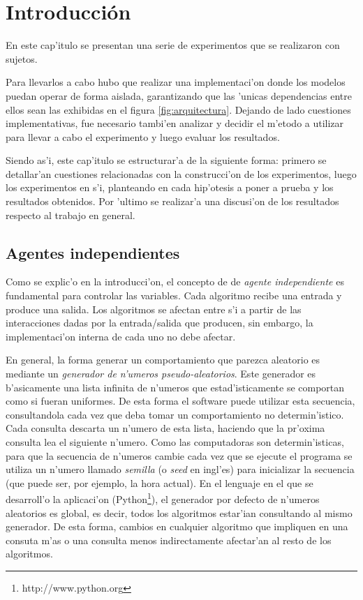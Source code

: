 \section{Introducci\'on}
En este cap'itulo se presentan una serie de experimentos que se realizaron con sujetos. 

Para llevarlos a cabo hubo que 
realizar una implementaci'on donde los modelos puedan operar de forma aislada, garantizando que las 'unicas dependencias 
entre ellos sean las exhibidas en el figura \ref{fig:arquitectura}. Dejando de lado cuestiones implementativas, 
fue necesario tambi'en analizar y decidir el m'etodo a utilizar para llevar a cabo el experimento y luego evaluar los resultados.

Siendo as'i, este cap'itulo se estructurar'a de la siguiente forma: primero se detallar'an cuestiones relacionadas con 
la construcci'on de los experimentos, luego los experimentos en s'i, planteando en cada hip'otesis a poner a prueba y los
resultados obtenidos.
Por 'ultimo se realizar'a una discusi'on de los resultados respecto al trabajo en general.

\subsection{Agentes independientes}
Como se explic'o en la introducci'on, el concepto de de \emph{agente independiente} es fundamental para controlar las variables. 
Cada algoritmo recibe una entrada y produce una salida. Los algoritmos se afectan entre s'i a partir de las 
interacciones dadas por la entrada/salida que producen, sin embargo, la implementaci'on interna de cada uno
no debe afectar. 

En general, la forma generar un comportamiento que parezca aleatorio es mediante un \emph{generador de n'umeros pseudo-aleatorios}. 
Este generador es b'asicamente una lista infinita de n'umeros que estad'isticamente se comportan como si fueran uniformes. 
De esta forma el software puede utilizar esta secuencia, consultandola cada vez que deba tomar un comportamiento no determin'istico. 
Cada consulta descarta un n'umero de esta lista, haciendo que la pr'oxima consulta lea el siguiente n'umero. 
Como las computadoras son determin'isticas, para que la secuencia de n'umeros cambie cada vez que se ejecute el programa se utiliza un n'umero 
llamado \emph{semilla} (o \emph{seed} en ingl'es) para inicializar la secuencia (que puede ser, por ejemplo, la hora actual). 
En el lenguaje en el que se desarroll'o la aplicaci'on (Python\footnote{http://www.python.org}), el generador por defecto de n'umeros aleatorios 
es global, es decir, todos los algoritmos estar'ian consultando al mismo generador. De esta forma, cambios en cualquier algoritmo que impliquen en 
una consuta m'as o una consulta menos indirectamente afectar'an al resto de los algoritmos.

